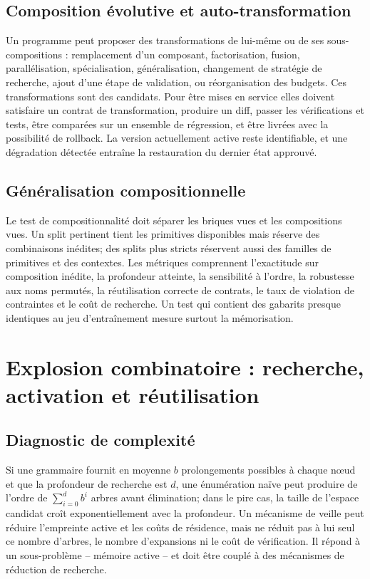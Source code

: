 \documentclass[11pt,a4paper]{article}
\theoremstyle{definition}
\theoremstyle{plain}
\theoremstyle{remark}
\begin{document}
\subsection{Composition évolutive et auto-transformation}
Un programme peut proposer des transformations de lui-même ou de ses sous-compositions : remplacement d'un composant, factorisation, fusion, parallélisation, spécialisation, généralisation, changement de stratégie de recherche, ajout d'une étape de validation, ou réorganisation des budgets. Ces transformations sont des candidats. Pour être mises en service elles doivent satisfaire un contrat de transformation, produire un diff, passer les vérifications et tests, être comparées sur un ensemble de régression, et être livrées avec la possibilité de rollback. La version actuellement active reste identifiable, et une dégradation détectée entraîne la restauration du dernier état approuvé.

\subsection{Généralisation compositionnelle}
Le test de compositionnalité doit séparer les briques vues et les compositions vues. Un split pertinent tient les primitives disponibles mais réserve des combinaisons inédites; des splits plus stricts réservent aussi des familles de primitives et des contextes. Les métriques comprennent l'exactitude sur composition inédite, la profondeur atteinte, la sensibilité à l'ordre, la robustesse aux noms permutés, la réutilisation correcte de contrats, le taux de violation de contraintes et le coût de recherche. Un test qui contient des gabarits presque identiques au jeu d'entraînement mesure surtout la mémorisation.

\section{Explosion combinatoire : recherche, activation et réutilisation}
\subsection{Diagnostic de complexité}
Si une grammaire fournit en moyenne $b$ prolongements possibles à chaque nœud et que la profondeur de recherche est $d$, une énumération naïve peut produire de l'ordre de $\sum_{i=0}^{d}b^i$ arbres avant élimination; dans le pire cas, la taille de l'espace candidat croît exponentiellement avec la profondeur. Un mécanisme de veille peut réduire l'empreinte active et les coûts de résidence, mais ne réduit pas à lui seul ce nombre d'arbres, le nombre d'expansions ni le coût de vérification. Il répond à un sous-problème -- mémoire active -- et doit être couplé à des mécanismes de réduction de recherche.
\end{document}
